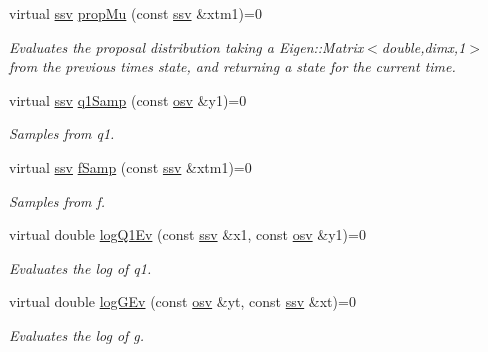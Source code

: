 \begin{DoxyCompactItemize}
virtual \hyperlink{classAPF_add8c737c90d68dc165d1e60dcd6b3b20}{ssv} \hyperlink{classAPF_a79fb2d229f1f98f7224dee8d745c22e9}{prop\+Mu} (const \hyperlink{classAPF_add8c737c90d68dc165d1e60dcd6b3b20}{ssv} \&xtm1)=0
\begin{DoxyCompactList}\small\item\em Evaluates the proposal distribution taking a Eigen\+::\+Matrix$<$double,dimx,1$>$ from the previous time\textquotesingle{}s state, and returning a state for the current time. \end{DoxyCompactList}\item 
virtual \hyperlink{classAPF_add8c737c90d68dc165d1e60dcd6b3b20}{ssv} \hyperlink{classAPF_a220f48020dedabcc11c6340e5a3da9b3}{q1\+Samp} (const \hyperlink{classAPF_aa3975009cab0e9e8945862884f091620}{osv} \&y1)=0
\begin{DoxyCompactList}\small\item\em Samples from q1. \end{DoxyCompactList}\item 
virtual \hyperlink{classAPF_add8c737c90d68dc165d1e60dcd6b3b20}{ssv} \hyperlink{classAPF_a2f60ac8c10bbf2813f5a5986a39a592b}{f\+Samp} (const \hyperlink{classAPF_add8c737c90d68dc165d1e60dcd6b3b20}{ssv} \&xtm1)=0
\begin{DoxyCompactList}\small\item\em Samples from f. \end{DoxyCompactList}\item 
virtual double \hyperlink{classAPF_a006a4302077efcdc10a03c8a1551864d}{log\+Q1\+Ev} (const \hyperlink{classAPF_add8c737c90d68dc165d1e60dcd6b3b20}{ssv} \&x1, const \hyperlink{classAPF_aa3975009cab0e9e8945862884f091620}{osv} \&y1)=0
\begin{DoxyCompactList}\small\item\em Evaluates the log of q1. \end{DoxyCompactList}\item 
virtual double \hyperlink{classAPF_ac49b5d5c09ff8cf7411d1284f8e0ba85}{log\+G\+Ev} (const \hyperlink{classAPF_aa3975009cab0e9e8945862884f091620}{osv} \&yt, const \hyperlink{classAPF_add8c737c90d68dc165d1e60dcd6b3b20}{ssv} \&xt)=0
\begin{DoxyCompactList}\small\item\em Evaluates the log of g. \end{DoxyCompactList}\end{DoxyCompactItemize}
